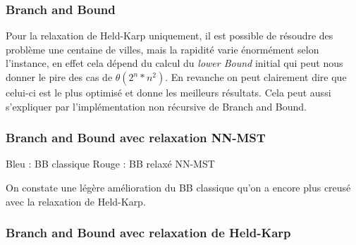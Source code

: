\documentclass[12pt]{report}
\begin{document}
{{{{{{{\begin{tabular}{|l|l|l|l|l|l|l|l|}
\end{tabular}

\subsubsection{Branch and Bound}

Pour la relaxation de Held-Karp uniquement, il est possible de résoudre des problème une centaine de villes, mais la rapidité varie énormément selon l'instance, en effet cela dépend du calcul du \textit{lower Bound} initial qui peut nous donner le pire des cas de \(\theta(2^n*n^2)\). En revanche on peut clairement dire que celui-ci est le plus optimisé et donne les meilleurs résultats. Cela peut aussi s'expliquer par l'implémentation non récursive de Branch and Bound.

\subsubsection{Branch and Bound avec relaxation NN-MST}

\newline
Bleu : BB classique
\newline
Rouge : BB relaxé NN-MST
\newline

On constate une légère amélioration du BB classique qu'on a encore plus creusé avec la relaxation de Held-Karp.

\subsubsection{Branch and Bound avec relaxation de Held-Karp}


}}}}}}}
\end{document}
